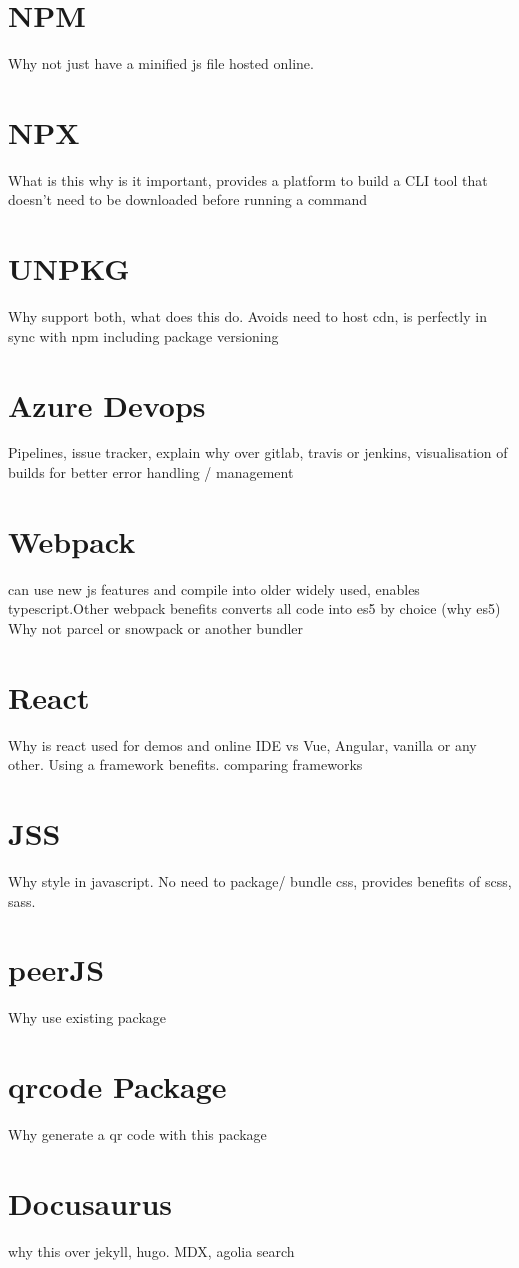 \documentclass{l4proj}
\begin{document}
\section{NPM}
\text Why not just have a minified js file hosted online.
\section{NPX}
\text What is this why is it important, provides a platform to build a CLI tool that doesn’t need to be downloaded before running a command
\section{UNPKG}
\text Why support both, what does this do. Avoids need to host cdn, is perfectly in sync with npm including package versioning
\section{Azure Devops}
\text Pipelines, issue tracker, explain why over gitlab, travis or jenkins, visualisation of builds for better error handling / management
\section{Webpack}
\text can use new js features and compile into older widely used, enables typescript.Other webpack benefits converts all code into es5 by choice (why es5)
Why not parcel or snowpack or another bundler
\section{React}
\text Why is react used for demos and online IDE vs Vue, Angular, vanilla or any other. Using a framework benefits.
comparing frameworks
\section{JSS}
\text Why style in javascript. No need to package/ bundle css, provides benefits of scss, sass.
\section{peerJS}
\text Why use existing package
\section{qrcode Package}
\text Why generate a qr code with this package
\section{Docusaurus}
\text why this over jekyll, hugo. MDX, agolia search
\end{document}
